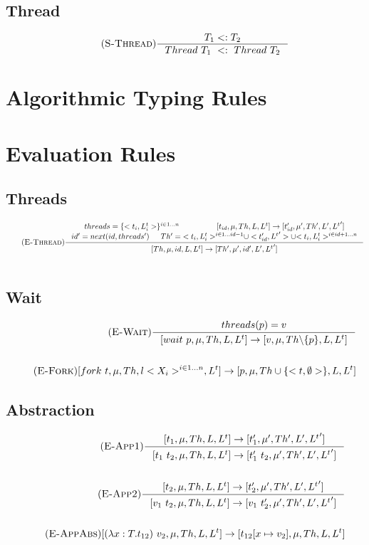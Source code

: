 \documentclass[12pt]{article}
\begin{document}
\subsection{Thread}
\begin{align*}
    \tag {\textsc{S-Thread}}
    \inference[]{T_1 <: T_2}{ Thread~T_1~<:~Thread~T_2}
\end{align*}

\section{Algorithmic Typing Rules}


\section{Evaluation Rules}

\subsection{Threads}
\begin{align*}
    \tag{\textsc{E-Thread}}
    \inference[]{threads = \{<t_i,L^t_i>\}^{i\in 1...n} & [t_{id},\mu,Th,L,L^t] -> [t_{id}',\mu',Th',L',{L^t}']\\
     id' = next(id,threads') & Th' = {<t_i,L_i^t>^{i\in 1...id-1}}\cup<t_{id}',{L^t}'>\cup{<t_i,L_i^t>^{i\in id+1...n}}}{[Th,\mu,id,L,L^t]->[Th',\mu',id',L',{L^t}']}
    \\
    \\
\end{align*}
\subsection{Wait}
\begin{align*}
    \tag {\textsc{E-Wait}}
    \inference{threads(p) = v}{[wait~p,\mu,Th,L,L^t] -> [v,\mu,Th\backslash\{p\},L,L^t]}
    \\
    \\
    \tag {\textsc{E-Fork}}
    {[fork\ t,\mu,Th, l <X_i>^{i\in1...n},L^t]-> [p ,\mu, Th\cup\{<t,\emptyset>\}, L,L^t]}
\end{align*}

\subsection{Abstraction}
\begin{align*}
\tag {\textsc{E-App1}}
\inference[]{[t_1,\mu,Th,L,L^t]->[t_1',\mu',Th', L',{L^t}']}{[t_1~t_2,\mu,Th,L,L^t]->[t_1'~t_2,\mu',Th', L',{L^t}']}
\\
\\
\tag {\textsc{E-App2}}
\inference[]{[t_2,\mu,Th,L,L^t]->[t_2',\mu',Th', L',{L^t}']}{[v_1~t_2,\mu,Th,L,L^t]->[v_1~t_2',\mu',Th', L',{L^t}']}
\\
\\
\tag {\textsc{E-AppAbs}}
[(\lambda x:T.t_{12})~v_2,\mu,Th,L,L^t]->[t_{12}[x\mapsto v_2],\mu,Th, L,L^t]
\end{align*}
\end{document}
